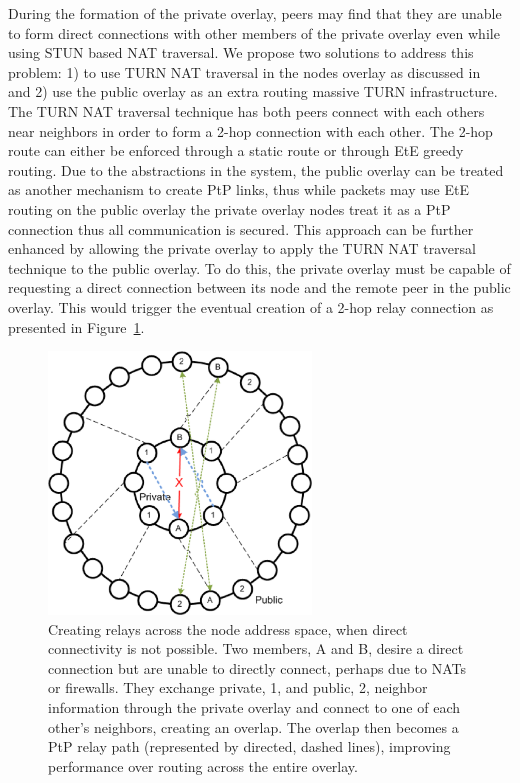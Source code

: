 \documentclass[conference]{IEEEtran}
\begin{document}
During the formation of the private overlay, peers may find that they are
unable to form direct connections with other members of the private overlay
even while using STUN based NAT traversal.  
We propose two solutions to address this problem: 1) to use TURN NAT traversal 
in the nodes overlay as discussed
in~\cite{nsdi10} and 2) use the public overlay as an extra routing massive TURN
infrastructure.  The TURN NAT traversal technique has both peers connect with
each others near neighbors in order to form a 2-hop connection with each other.
The 2-hop route can either be enforced through a static route or through EtE
greedy routing.  Due to the abstractions in the system, the public overlay can
be treated as another mechanism to create PtP links, thus while packets may use
EtE routing on the public overlay the private overlay nodes treat it as a PtP
connection thus all communication is secured.  This approach can be further
enhanced by allowing the private overlay to apply the TURN NAT traversal
technique to the public overlay.  To do this, the private overlay must be
capable of requesting a direct connection between its node and the remote
peer in the public overlay.  This would trigger the eventual creation of a 2-hop
relay connection as presented in Figure~\ref{fig:overlay_relay}.

\begin{figure}[h]
\centering
\includegraphics[width=2.75in]{subring_tunnel.eps}
\caption{Creating relays across the node address space, when direct
connectivity is not possible.  Two members, A and B, desire a direct connection
but are unable to directly connect, perhaps due to NATs or firewalls.  They
exchange private, 1, and public, 2, neighbor information through the private
overlay and connect to one of each other's neighbors, creating an overlap.  The
overlap then becomes a PtP relay path (represented by directed, dashed lines),
improving performance over routing across the entire overlay.}
\label{fig:overlay_relay}
\end{figure}
\end{document}
